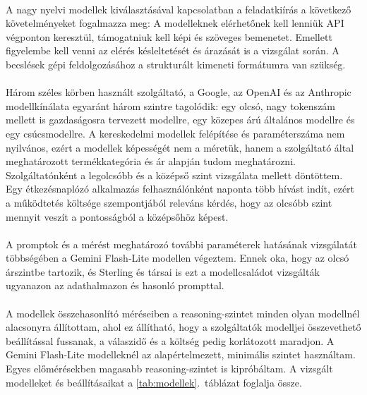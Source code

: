 \paragraph{}A nagy nyelvi modellek kiválasztásával kapcsolatban a feladatkiírás
a következő követelményeket fogalmazza meg:
A modelleknek elérhetőnek kell lenniük API végponton keresztül,
támogatniuk kell képi és szöveges bemenetet.
Emellett figyelembe kell venni az elérés késleltetését és árazását is a vizsgálat
során.
A becslések gépi feldolgozásához a strukturált kimeneti formátumra van szükség.

\paragraph{}Három széles körben használt szolgáltató, a Google, az OpenAI és az Anthropic
modellkínálata egyaránt három szintre tagolódik: egy olcsó, nagy tokenszám mellett is gazdaságosra tervezett
modellre, egy közepes árú általános modellre és egy csúcsmodellre. A kereskedelmi
modellek felépítése és paraméterszáma nem nyilvános, ezért a modellek képességét nem a
méretük, hanem a szolgáltató által meghatározott termékkategória és ár alapján tudom meghatározni.
Szolgáltatónként a legolcsóbb és a középső szint vizsgálata mellett döntöttem. Egy étkezésnaplózó
alkalmazás felhasználónként naponta több hívást indít, ezért a működtetés költsége
szempontjából releváns kérdés, hogy az olcsóbb szint mennyit veszít a pontosságból a
középsőhöz képest.

\paragraph{}A promptok és a mérést meghatározó további paraméterek hatásának vizsgálatát többségében a Gemini Flash-Lite modellen
végeztem. Ennek oka, hogy az olcsó árszintbe tartozik, és Sterling és társai \cite{sterling2026vlm} is ezt a modellcsaládot vizsgálták 
ugyanazon az adathalmazon és hasonló prompttal.

\paragraph{}A modellek összehasonlító méréseiben a reasoning-szintet minden olyan 
modellnél alacsonyra állítottam, ahol ez állítható, hogy a szolgáltatók modelljei 
összevethető beállítással fussanak, a válaszidő és a költség pedig korlátozott 
maradjon. A Gemini Flash-Lite modelleknél az alapértelmezett, minimális szintet 
használtam. Egyes előmérésekben magasabb reasoning-szintet is kipróbáltam.
A vizsgált modelleket és beállításaikat a \ref{tab:modellek}.~táblázat foglalja össze.

